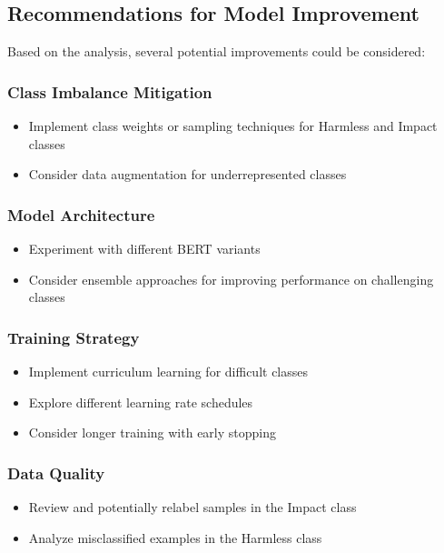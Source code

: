         \vspace{-0.3cm}
        
    \subsection{Recommendations for Model Improvement}

        Based on the analysis, several potential improvements could be considered:

        \subsubsection{Class Imbalance Mitigation}
        
            \begin{itemize}
                \item Implement class weights or sampling techniques for Harmless and Impact classes
                \item Consider data augmentation for underrepresented classes
            \end{itemize}

        \subsubsection{Model Architecture}
        
            \begin{itemize}
                \item Experiment with different BERT variants
                \item Consider ensemble approaches for improving performance on challenging classes
            \end{itemize}

        \subsubsection{Training Strategy}
        
            \begin{itemize}
                \item Implement curriculum learning for difficult classes
                \item Explore different learning rate schedules
                \item Consider longer training with early stopping
            \end{itemize}

        \subsubsection{Data Quality}
        
            \begin{itemize}
                \item Review and potentially relabel samples in the Impact class
                \item Analyze misclassified examples in the Harmless class
            \end{itemize}
    